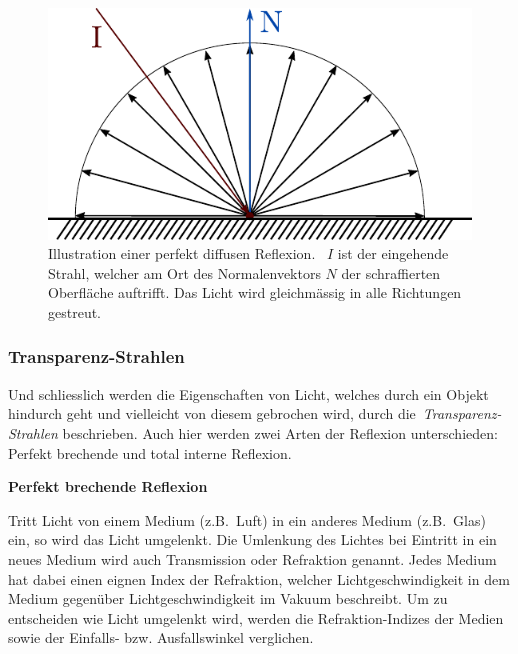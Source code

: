\begin{figure}[H]\label{fig:ray_tracing_diffuse_reflection}
    \centering
    \includegraphics{img/perfect_diffuse_reflection.pdf}
    \caption{Illustration einer perfekt diffusen
        Reflexion.~\protect\footnotemark{}
        $I$ ist der eingehende Strahl, welcher am Ort des
        Normalenvektors $N$ der schraffierten Oberfläche auftrifft. Das
        Licht wird gleichmässig in alle Richtungen gestreut.}
\end{figure}

\subsubsection{Transparenz-Strahlen}
\label{ssubsec:ray_tracing:transparency_rays}

Und schliesslich werden die Eigenschaften von Licht, welches durch ein
Objekt hindurch geht und vielleicht von diesem gebrochen wird, durch
die~\textit{Transparenz-Strahlen} beschrieben.  Auch hier werden zwei
Arten der Reflexion unterschieden: Perfekt brechende und total interne
Reflexion.

\textbf{Perfekt brechende Reflexion}

Tritt Licht von einem Medium (z.B.\ Luft) in ein anderes Medium (z.B.\
Glas) ein, so wird das Licht umgelenkt. Die Umlenkung des Lichtes bei
Eintritt in ein neues Medium wird auch Transmission oder Refraktion
genannt. Jedes Medium hat dabei einen eignen Index der Refraktion,
welcher Lichtgeschwindigkeit in dem Medium gegenüber
Lichtgeschwindigkeit im Vakuum beschreibt.
Um zu entscheiden wie Licht umgelenkt wird, werden die
Refraktion-Indizes der Medien sowie der Einfalls- bzw. Ausfallswinkel
verglichen.

